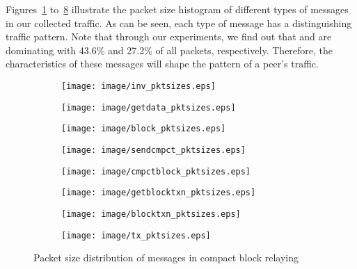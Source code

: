 \begin{comment}
Table~\ref{table:msg_proportion} demonstrates the proportion of different messages in the \bc traffic we collected 
for 31 days. As can be seen, \code{tx} and \code{inv} are dominating with 43.6\% and 27.2\% of all packets, respectively. 
Therefore, the characteristics of these messages will shape the pattern of a \bc peer's traffic. 
\end{comment}


Figures~\ref{fig:inv_pktsizes} to~\ref{fig:tx_pktsizes} illustrate
the  packet size histogram of 
different types of \bc messages in our collected \bc traffic.
As can be seen, each type of message has a distinguishing traffic pattern. Note that through our experiments, we find out that  and  are dominating with 43.6\% and 27.2\% of all packets, respectively. 
Therefore, the characteristics of these messages will shape the pattern of a \bc peer's traffic. 
\begin{figure*}[h]
\begin{subfigure}{0.24\linewidth}
\texttt{[image: image/inv\_pktsizes.eps]}
\caption{}
\label{fig:inv_pktsizes}
\end{subfigure}
\begin{subfigure}{0.24\linewidth}
\texttt{[image: image/getdata\_pktsizes.eps]}
\caption{}
\label{fig:getdata_pktsizes}
\end{subfigure}
\begin{subfigure}{0.24\linewidth}
\texttt{[image: image/block\_pktsizes.eps]}
\caption{}
\label{fig:block_pktsizes}
\end{subfigure}
\begin{subfigure}{0.24\linewidth}
\texttt{[image: image/sendcmpct\_pktsizes.eps]}
\caption{}
\label{fig:sendcmpct_pktsizes}
\end{subfigure}
\begin{subfigure}{0.24\linewidth}
\texttt{[image: image/cmpctblock\_pktsizes.eps]}
\caption{}
\label{fig:cmpctblock_pktsizes}
\end{subfigure}
\begin{subfigure}{0.24\linewidth}
\texttt{[image: image/getblocktxn\_pktsizes.eps]}
\caption{}
\label{fig:getblocktxn_pktsizes}
\end{subfigure}
\begin{subfigure}{0.24\linewidth}
\texttt{[image: image/blocktxn\_pktsizes.eps]}
\caption{}
\label{fig:blocktxn_pktsizes}
\end{subfigure}
\begin{subfigure}{0.24\linewidth}
\texttt{[image: image/tx\_pktsizes.eps]}
\caption{}
\label{fig:tx_pktsizes}
\end{subfigure}
\caption{Packet size distribution of \bc messages in compact block relaying}\label{fig:sizedist}
\end{figure*}

